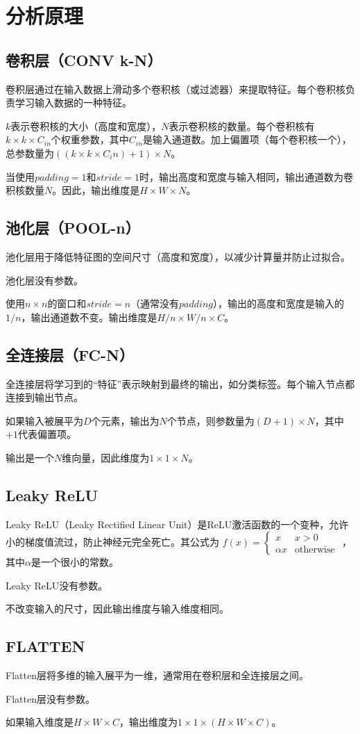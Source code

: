 \section{分析原理}\label{sec:theory}

\subsection{卷积层（CONV k-N）}

卷积层通过在输入数据上滑动多个卷积核（或过滤器）来提取特征。每个卷积核负责学习输入数据的一种特征。

$k$表示卷积核的大小（高度和宽度），$N$表示卷积核的数量。每个卷积核有$k \times k \times C_{in}$个权重参数，其中$C_{in}$是输入通道数。加上偏置项（每个卷积核一个），总参数量为$((k \times k \times C_in)+1) \times N$。

当使用$padding=1$和$stride=1$时，输出高度和宽度与输入相同，输出通道数为卷积核数量$N$。因此，输出维度是$H \times W \times N$。

\subsection{池化层（POOL-n）}

池化层用于降低特征图的空间尺寸（高度和宽度），以减少计算量并防止过拟合。

池化层没有参数。

使用$n \times n$的窗口和$stride=n$（通常没有$padding$），输出的高度和宽度是输入的$1/n$，输出通道数不变。输出维度是$H/n \times W/n \times C$。

\subsection{全连接层（FC-N）}

全连接层将学习到的“特征”表示映射到最终的输出，如分类标签。每个输入节点都连接到输出节点。

如果输入被展平为$D$个元素，输出为$N$个节点，则参数量为$(D+1) \times N$，其中$+1$代表偏置项。

输出是一个$N$维向量，因此维度为$1 \times 1 \times N$。

\subsection{Leaky ReLU}

Leaky ReLU（Leaky Rectified Linear Unit）是ReLU激活函数的一个变种，允许小的梯度值流过，防止神经元完全死亡。其公式为
$
f(x) = \begin{cases} 
	x & x > 0 \\
	\alpha x & \text{otherwise}
\end{cases}
$
，其中$\alpha$是一个很小的常数。

Leaky ReLU没有参数。

不改变输入的尺寸，因此输出维度与输入维度相同。

\subsection{FLATTEN}

Flatten层将多维的输入展平为一维，通常用在卷积层和全连接层之间。

Flatten层没有参数。

如果输入维度是$H \times W \times C$，输出维度为$1 \times 1 \times (H \times W \times C)$。